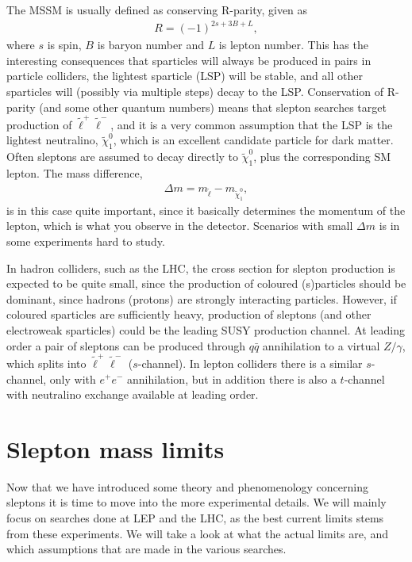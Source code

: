 \documentclass[twocolumn,a4paper,10pt]{article}
\begin{document}
The MSSM is usually defined as conserving R-parity, given as  
\begin{align*}
R = (-1)^{2s + 3B + L}, 
\end{align*}
where $s$ is spin, $B$ is baryon number and $L$ is lepton number. This has the 
interesting consequences that sparticles will always be produced in pairs in particle colliders, 
the lightest sparticle (LSP) will be stable, and all other sparticles will (possibly via multiple steps) 
decay to the LSP. Conservation of R-parity (and some other quantum numbers) means that slepton searches 
target production of $\tilde{\ell}^+\tilde{\ell}^-$, and it is a very common assumption that the LSP is 
the lightest neutralino, $\tilde{\chi}_1^0$, which is an excellent candidate particle for dark matter. 
Often sleptons are assumed to decay directly to $\tilde{\chi}_1^0$, plus the corresponding SM lepton. 
The mass difference, 
\begin{align}
\Delta m = m_{\tilde{\ell}} - m_{\tilde{\chi}^0_1}, 
\label{eq:delta m}
\end{align}  
is in this case quite important, since it basically determines the momentum of the lepton, which is 
what you observe in the detector. Scenarios with small $\Delta m$ is in some experiments hard to study. 

In hadron colliders, such as the LHC, the cross section for slepton production is expected to be 
quite small, since the production of coloured (s)particles should be dominant, since hadrons (protons) 
are strongly interacting particles. 
However, if coloured sparticles are sufficiently heavy, production of sleptons (and other electroweak 
sparticles) could be the leading SUSY production channel. At leading order a pair of sleptons can be 
produced through $q\bar{q}$ annihilation to a virtual $Z/\gamma$, which splits into 
$\tilde{\ell}^+\tilde{\ell}^-$ ($s$-channel). In lepton colliders there is a similar $s$-channel, only 
with $e^+e^-$ annihilation, but in addition there is also a $t$-channel with neutralino exchange 
available at leading order.  

\section{Slepton mass limits}

Now that we have introduced some theory and phenomenology concerning sleptons it is time to move into 
the more experimental details. We will mainly focus on searches done at LEP and the LHC, as the best 
current limits stems from these experiments. We will take a look at what the actual limits are, and 
which assumptions that are made in the various searches.    
\end{document}
